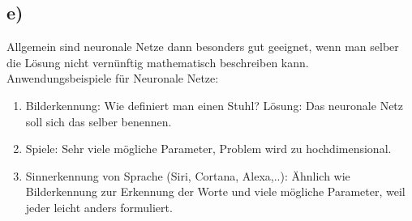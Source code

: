 \documentclass[a4paper, 11pt]{article}
\begin{document}
\subsection*{e)}
Allgemein sind neuronale Netze dann besonders gut geeignet, wenn man selber die Lösung
nicht vernünftig mathematisch beschreiben kann.
Anwendungsbeispiele für Neuronale Netze:
\begin{enumerate}
  \item Bilderkennung: Wie definiert man einen Stuhl? Lösung: Das neuronale Netz soll sich
  das selber benennen.
  \item Spiele: Sehr viele mögliche Parameter, Problem wird zu hochdimensional.
  \item Sinnerkennung von Sprache (Siri, Cortana, Alexa,..): Ähnlich wie Bilderkennung zur Erkennung der Worte und viele mögliche Parameter, weil jeder leicht anders formuliert.
\end{enumerate}
\end{document}
